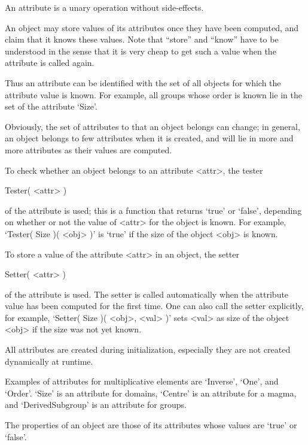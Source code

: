 An attribute is a unary operation without side-effects.

An object may store values of its attributes once they have been
computed, and claim that it knows these values.
Note that ``store'' and ``know'' have to be understood in the sense that 
it is very cheap to get such a value when the attribute is called again.


Thus an attribute can be identified with the set of all objects for which
the attribute value is known.
For example, all groups whose order is known lie in the set of the
attribute `Size'.

Obviously, the set of attributes to that an object belongs can change;
in general, an object belongs to few attributes when it is created,
and will lie in more and more attributes as their values are computed.

To check whether an object belongs to an attribute <attr>,
the tester

\>Tester( <attr> )

of the attribute is used;
this is a function that returns `true' or `false',
depending on whether or not the value of <attr> for the object is known.
For example, `Tester( Size )( <obj> )' is `true' if the size of the object
<obj> is known.


To store a value of the attribute <attr> in an object,
the setter

\>Setter( <attr> )

of the attribute is used.
The setter is called automatically when the attribute value has been
computed for the first time.
One can also call the setter explicitly,
for example, `Setter( Size )( <obj>, <val> )' sets <val> as size of the
object <obj> if the size was not yet known.

All attributes are created during initialization,
especially they are not created dynamically at runtime.

Examples of attributes for multiplicative elements are `Inverse', `One',
and `Order'.
`Size' is an attribute for domains, `Centre' is an attribute for a magma,
and `DerivedSubgroup' is an attribute for groups.


The properties of an object are those of its attributes whose values are
`true' or `false'.

